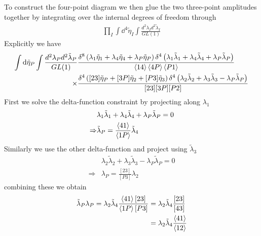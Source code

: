 \documentclass[a4paper,12pt]{article}
\begin{document}
To construct the four-point diagram we then glue the two three-point amplitudes together by integrating over the internal degrees of freedom through
\begin{equation}
	\begin{aligned}
		\prod_{I}\int \dd^4 \tilde \eta_I \int\frac{d^2\lambda_Id^2\tilde\lambda_I}{GL(1)}
	\end{aligned}
\end{equation}
Explicitly we have
\begin{equation}
	\begin{aligned}
		\int \dd \tilde \eta_{P} \int\frac{d^2\lambda_Pd^2\tilde\lambda_P}{GL(1)}&
		\frac{\delta^{8}\left(\lambda_1\tilde\eta_1+\lambda_{4}\tilde\eta_{4}+\lambda_{P}\tilde\eta_{P}\right)\delta^{4}\left(\lambda_{1}\tilde\lambda_{1}+\lambda_{4}\tilde\lambda_{4}+\lambda_{P}\tilde\lambda_{P}\right)}{\expval{14}\expval{4P}\expval{P1}}\\
		\times&\frac{\delta^{4}\left([23]\tilde\eta_{P}+[3P]\tilde\eta_{2}+[P 3]\tilde\eta_{3}\right)\delta^{4}\left(\lambda_{2}\tilde\lambda_{2}+\lambda_{3}\tilde\lambda_{3}-\lambda_{P}\tilde\lambda_{P}
			\right)}{[23][3P][P2]}
	\end{aligned}
\end{equation}
First we solve the delta-function constraint by projecting along $\lambda_1$
\begin{equation}
	\begin{aligned}
		&\lambda_{1}\tilde\lambda_{1}+\lambda_{4}\tilde\lambda_{4}+\lambda_{P}\tilde\lambda_{P}=0\\
		\Rightarrow& \tilde\lambda_{P}=\frac{\expval{41}}{\expval{1P}}\tilde\lambda_4
	\end{aligned}
\end{equation}
Similarly we use the other delta-function and project using $\tilde \lambda_3$
\begin{equation}
	\begin{aligned}
		&\lambda_{2}\tilde\lambda_{2}+\lambda_{3}\tilde\lambda_{3}-\lambda_{P}\tilde\lambda_{P}=0\\
		\Rightarrow& 
		\lambda_{P}=\frac{[23]}{[P3]}\lambda_2
	\end{aligned}
\end{equation}
combining these we obtain
\begin{equation}
	\begin{aligned}
		\tilde\lambda_P \lambda_P=\lambda_2 \tilde\lambda_4 \frac{\expval{41}[23]}{\expval{1P}[P3]}&=\lambda_2 \tilde\lambda_4 \frac{[23]}{[43]}\\
		&=\lambda_2 \tilde\lambda_4 \frac{\expval{41}}{\expval{12}}
 	\end{aligned}
\end{equation}
\end{document}
